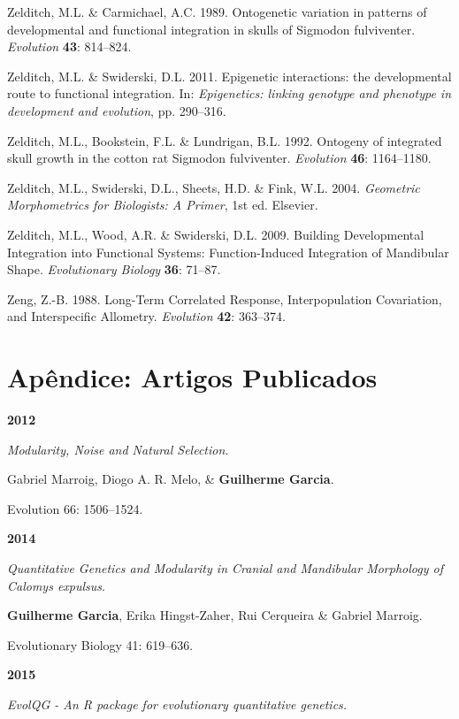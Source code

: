 \documentclass[12pt,twoside]{report}
\begin{document}
Zelditch, M.L. \& Carmichael, A.C. 1989. Ontogenetic variation in
patterns of developmental and functional integration in skulls of
Sigmodon fulviventer. \emph{Evolution} \textbf{43}: 814--824.

Zelditch, M.L. \& Swiderski, D.L. 2011. Epigenetic interactions: the
developmental route to functional integration. In: \emph{Epigenetics:
linking genotype and phenotype in development and evolution}, pp.
290--316.

Zelditch, M.L., Bookstein, F.L. \& Lundrigan, B.L. 1992. Ontogeny of
integrated skull growth in the cotton rat Sigmodon fulviventer.
\emph{Evolution} \textbf{46}: 1164--1180.

Zelditch, M.L., Swiderski, D.L., Sheets, H.D. \& Fink, W.L. 2004.
\emph{Geometric Morphometrics for Biologists: A Primer}, 1st ed.
Elsevier.

Zelditch, M.L., Wood, A.R. \& Swiderski, D.L. 2009. Building
Developmental Integration into Functional Systems: Function-Induced
Integration of Mandibular Shape. \emph{Evolutionary Biology}
\textbf{36}: 71--87.

Zeng, Z.-B. 1988. Long-Term Correlated Response, Interpopulation
Covariation, and Interspecific Allometry. \emph{Evolution} \textbf{42}:
363--374.

\chapter*{Apêndice: Artigos Publicados}

\textbf {2012}

\textit {Modularity, Noise and Natural Selection.}

Gabriel Marroig, Diogo A. R. Melo, \& \textbf {Guilherme Garcia}.  

Evolution 66: 1506–1524.

\vspace {0.3 cm}

\textbf{2014}

\textit{Quantitative Genetics and Modularity in Cranial and Mandibular Morphology of \emph{Calomys expulsus}}.

\textbf {Guilherme Garcia}, Erika Hingst-Zaher, Rui Cerqueira \& Gabriel Marroig.

Evolutionary Biology 41: 619–636.

\vspace {0.3 cm}

\textbf{2015}

\textit {EvolQG - An R package for evolutionary quantitative genetics.}
\end{document}
